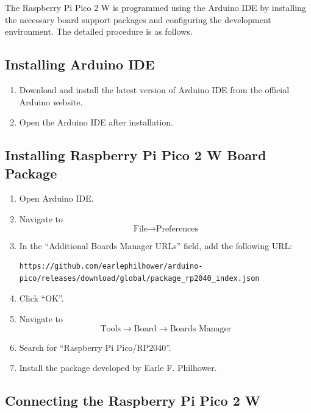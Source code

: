\documentclass[12pt,a4paper]{article}
\begin{document}
The Raspberry Pi Pico 2 W is programmed using the Arduino IDE by installing the necessary board support packages and configuring the development environment. The detailed procedure is as follows.



\subsection{Installing Arduino IDE}

\begin{enumerate}
    \item Download and install the latest version of Arduino IDE from the official Arduino website.
    \item Open the Arduino IDE after installation.
\end{enumerate}

\subsection{Installing Raspberry Pi Pico 2 W Board Package}

\begin{enumerate}
    \item Open Arduino IDE.
    \item Navigate to
    $$
    \text{File} \rightarrow \text{Preferences}
    $$
    \item In the ``Additional Boards Manager URLs'' field, add the following URL:
    
\begin{verbatim}
https://github.com/earlephilhower/arduino-pico/releases/download/global/package_rp2040_index.json
\end{verbatim}

    \item Click ``OK''.
    
    \item Navigate to
    \[
    \text{Tools} \rightarrow \text{Board} \rightarrow \text{Boards Manager}
    \]

    \item Search for ``Raspberry Pi Pico/RP2040''.

    \item Install the package developed by Earle F. Philhower.
\end{enumerate}

\subsection{Connecting the Raspberry Pi Pico 2 W}
\end{document}
